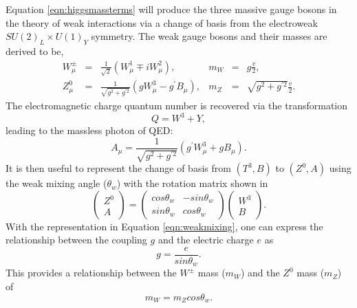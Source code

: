 Equation \ref{eqn:higgsmassterms} will produce the three massive gauge bosons in the theory of weak interactions via a change of basis from the electroweak $SU(2)_L \times U(1)_{Y}$ symmetry.
The weak gauge bosons and their masses are derived to be,
\begin{equation}
\begin{array}{rclrcl}
W_{\mu}^{\pm} & = & \frac{1}{\sqrt{2}}(W_{\mu}^{1} \mp iW_{\mu}^{2}),                        & m_{W} & = & g\frac{v}{2}, \\
Z_{\mu}^{0}   & = & \frac{1}{\sqrt{g^{2} + g^{\prime 2}}}(gW_{\mu}^{3} - g^{\prime}B_{\mu}), & m_{Z} & = & \sqrt{g^{2} + g^{\prime 2}}\frac{v}{2}.
\end{array}
\end{equation}
The electromagnetic charge quantum number is recovered via the transformation 
\begin{equation}
Q = W^{3} + Y,
\end{equation}
leading to the massless photon of QED:
\begin{equation}
A_{\mu} = \frac{1}{\sqrt{g^{2} + g^{\prime 2}}}(g^{\prime} W_{\mu}^{3} + gB_{\mu}).
\end{equation}
It is then useful to represent the change of basis from $(T^3, B)$ to $(Z^{0},A)$ using the weak mixing angle ($\theta_{w}$) with the rotation matrix shown in
\begin{equation}
\label{eqn:weakmixing}
\begin{pmatrix}Z^{0} \\ A \end{pmatrix} = \begin{pmatrix}cos\theta_{w} & -sin\theta_{w} \\ sin\theta_{w} & cos\theta_{w}\end{pmatrix}\begin{pmatrix}W^3 \\ B\end{pmatrix}.
\end{equation}
With the representation in Equation \ref{eqn:weakmixing}, one can express the relationship between the coupling $g$ and the electric charge $e$ as
\begin{equation}
g = \frac{e}{sin\theta_{w}}.
\end{equation}
This provides a relationship between the $W^{\pm}$ mass ($m_{W}$) and the $Z^{0}$ mass ($m_{Z}$) of
\begin{equation}
m_{W} = m_{Z}cos\theta_{w}.
\end{equation}

